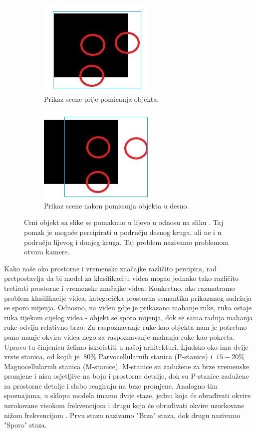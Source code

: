 \documentclass[times, utf8, diplomski,  numeric]{fer}
\begin{document}
\begin{figure}[htp]
\begin{subfigure}{.5\textwidth}
\centering
\includegraphics[width=.5\textwidth]{./images/mov1-p}\hfill
\caption{Prikaz scene prije pomicanja objekta.}
\label{fig:mov-1}
\end{subfigure}
\begin{subfigure}{.5\textwidth}
\centering
\includegraphics[width=.5\textwidth]{./images/mov2-p}\hfill
\caption{Prikaz scene nakon pomicanja objekta u desno.}
\label{fig:mov-2}
\end{subfigure}
\caption{Crni objekt sa slike \protect{} se pomaknuo u lijevo u odnosu na sliku \protect{}. Taj pomak je moguće percipirati u području desnog kruga, ali ne i u području lijevog i donjeg kruga. Taj problem nazivamo problemom otvora kamere.}
\label{fig:apeture}
\end{figure}
Kako naše oko prostorne i vremenske značajke različito percipira, rad pretpostavlja da bi model za klasifikaciju videa mogao jednako tako različito tretirati prostorne i vremenske značajke videa. Konkretno, ako razmatramo problem klasifikacije videa, kategorička prostorna semantika prikazanog sadržaja se sporo mijenja. Odnosno, na videu gdje je prikazano mahanje ruke, ruka ostaje ruka tijekom cijelog videa - objekt se sporo mijenja, dok se sama radnja mahanja ruke odvija relativno brzo. Za raspoznavanje ruke kao objekta nam je potrebno puno manje okvira videa nego za raspoznavanje mahanja ruke kao pokreta. Upravo tu činjenicu želimo iskoristiti u našoj arhitekturi. Ljudsko oko ima dvije vrste stanica, od kojih je $~80\%$ Parvocellularnih stanica (P-stanice) i $~15-20\%$ Magnocellularnih stanica (M-stanice). M-stanice su zadužene za brze vremenske promjene i nisu osjetljive na boju i prostorne detalje, dok su P-stanice zadužene za prostorne detalje i slabo reagiraju na brze promjene. Analogno tim spoznajama, u sklopu modela imamo dvije staze, jednu koja će obrađivati okvire uzrokovane visokom frekvencijom i drugu koja će obrađivati okvire uzorkovane nižom frekvencijom \cite{slow-fast}. Prvu stazu nazivamo "Brza" staza, dok drugu nazivamo "Spora" staza.
\end{document}
